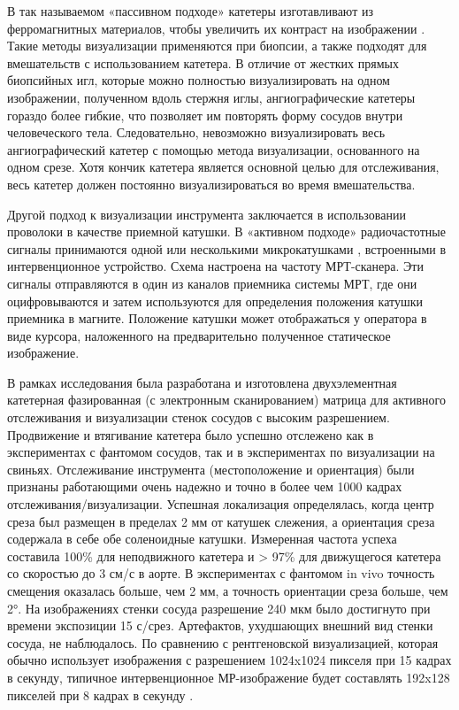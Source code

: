 В так называемом «пассивном подходе» катетеры изготавливают из ферромагнитных материалов, чтобы увеличить их контраст на изображении \cite{litlink24}. Такие методы визуализации применяются при биопсии, а также подходят для вмешательств с использованием катетера. В отличие от жестких прямых биопсийных игл, которые можно полностью визуализировать на одном изображении, полученном вдоль стержня иглы, ангиографические катетеры гораздо более гибкие, что позволяет им повторять форму сосудов внутри человеческого тела. Следовательно, невозможно визуализировать весь ангиографический катетер с помощью метода визуализации, основанного на одном срезе. Хотя кончик катетера является основной целью для отслеживания, весь катетер должен постоянно визуализироваться во время вмешательства.

Другой подход к визуализации инструмента заключается в использовании проволоки в качестве приемной катушки. В «активном подходе» радиочастотные сигналы принимаются одной или несколькими микрокатушками \cite{litlink24}, встроенными в интервенционное устройство. Схема настроена на частоту МРТ-сканера. Эти сигналы отправляются в один из каналов приемника системы МРТ, где они оцифровываются и затем используются для определения положения катушки приемника в магните. Положение катушки может отображаться у оператора в виде курсора, наложенного на предварительно полученное статическое изображение.

В рамках исследования \cite{litlink25} была разработана и изготовлена двухэлементная катетерная фазированная (с электронным сканированием) матрица для активного отслеживания и визуализации стенок сосудов с высоким разрешением. Продвижение и втягивание катетера было успешно отслежено как в экспериментах с фантомом сосудов, так и в экспериментах по визуализации на свиньях. Отслеживание инструмента (местоположение и ориентация) были признаны работающими очень надежно и точно в более чем 1000 кадрах отслеживания/визуализации. Успешная локализация определялась, когда центр среза был размещен в пределах 2 мм от катушек слежения, а ориентация среза содержала в себе обе соленоидные катушки. Измеренная частота успеха составила 100\% для неподвижного катетера и > 97\% для движущегося катетера со скоростью до 3 см/с в аорте. В экспериментах с фантомом in vivo точность смещения оказалась больше, чем 2 мм, а точность ориентации среза больше, чем 2°. На изображениях стенки сосуда разрешение 240 мкм было достигнуто при времени экспозиции 15 с/срез. Артефактов, ухудшающих внешний вид стенки сосуда, не наблюдалось. По сравнению с рентгеновской визуализацией, которая обычно использует изображения с разрешением 1024x1024 пикселя при 15 кадрах в секунду, типичное интервенционное МР-изображение будет составлять 192x128 пикселей при 8 кадрах в секунду \cite{litlink21}.

